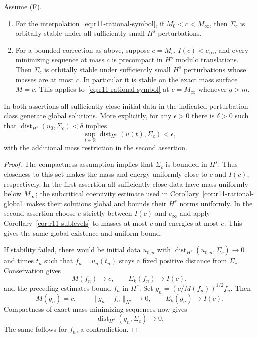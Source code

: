 \begin{theorem}
\label{thm:r11-set-stability}
Assume \textup{(F)}.
\begin{enumerate}
 \item For the interpolation~\eqref{eq:r11-rational-symbol}, if
 $M_0<c<M_\infty$, then $\Sigma_c$ is orbitally stable under all
 sufficiently small $H^s$ perturbations.
 \item For a bounded correction as above, suppose $c=M_c$,
 $I(c)<e_\infty$, and every minimizing sequence at mass $c$ is
 precompact in $H^s$ modulo translations.  Then $\Sigma_c$ is orbitally
 stable under sufficiently small $H^s$ perturbations whose masses are
 at most $c$.  In particular it is stable on the exact mass surface
 $M=c$.  This applies to~\eqref{eq:r11-rational-symbol} at
 $c=M_\infty$ whenever $q>m$.
\end{enumerate}
In both assertions all sufficiently close initial data in the indicated
perturbation class generate global solutions.  More explicitly, for
any $\epsilon>0$ there is $\delta>0$ such that
$\operatorname{dist}_{H^s}(u_0,\Sigma_c)<\delta$ implies
\[
 \sup_{t\in\mathbb R}\operatorname{dist}_{H^s}(u(t),\Sigma_c)<\epsilon,
\]
with the additional mass restriction in the second assertion.
\end{theorem}

\begin{proof}
The compactness assumption implies that $\Sigma_c$ is bounded in
$H^s$.  Thus closeness to this set makes the mass and energy uniformly
close to $c$ and $I(c)$, respectively.  In the first assertion all
sufficiently close data have mass uniformly below $M_\infty$; the
subcritical coercivity estimate used in
Corollary~\ref{cor:r11-rational-global} makes their solutions global
and bounds their $H^s$ norms uniformly.  In the second assertion choose
$e$ strictly between $I(c)$ and $e_\infty$ and apply
Corollary~\ref{cor:r11-sublevels} to masses at most $c$ and energies
at most $e$.  This gives the same global existence and uniform bound.

If stability failed, there would be initial data $u_{0,n}$ with
$\operatorname{dist}_{H^s}(u_{0,n},\Sigma_c)\to0$ and times $t_n$
such that $f_n=u_n(t_n)$ stays a fixed positive distance from
$\Sigma_c$.  Conservation gives
\[
 M(f_n)\longrightarrow c,\qquad E_k(f_n)\longrightarrow I(c),
\]
and the preceding estimates bound $f_n$ in $H^s$.  Set
$g_n=(c/M(f_n))^{1/2}f_n$.  Then
\[
 M(g_n)=c,\qquad \|g_n-f_n\|_{H^s}\longrightarrow0,\qquad
 E_k(g_n)\longrightarrow I(c).
\]
Compactness of exact-mass minimizing sequences now gives
\[
 \operatorname{dist}_{H^s}(g_n,\Sigma_c)\longrightarrow0.
\]
The same follows for $f_n$, a contradiction.
\end{proof}

